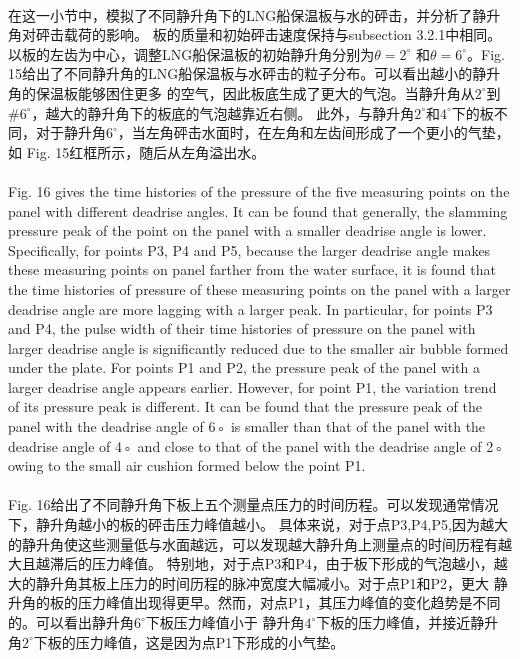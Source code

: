 \documentclass[UTF8]{ctexart}
\begin{document}
\paragraph{\quad}在这一小节中，模拟了不同静升角下的LNG船保温板与水的砰击，并分析了静升角对砰击载荷的影响。
                板的质量和初始砰击速度保持与subsection 3.2.1中相同。以板的左齿为中心，调整LNG船保温板的初始静升角分别为$\theta = 2^\circ$
                和$\theta = 6^\circ$。Fig. 15给出了不同静升角的LNG船保温板与水砰击的粒子分布。可以看出越小的静升角的保温板能够困住更多
                的空气，因此板底生成了更大的气泡。当静升角从$2^\circ$到#$6^\circ$，越大的静升角下的板底的气泡越靠近右侧。
                此外，与静升角$2^\circ$和$4^\circ$下的板不同，对于静升角$6^\circ$，当左角砰击水面时，在左角和左齿间形成了一个更小的气垫，如
                Fig. 15红框所示，随后从左角溢出水。

\paragraph{\quad}Fig. 16 gives the time histories of the pressure of the five measuring points on the panel 
                with different deadrise angles. It can be found that generally, the slamming pressure peak 
                of the point on the panel with a smaller deadrise angle is lower. Specifically, for points 
                P3, P4 and P5, because the larger deadrise angle makes these measuring points on panel farther 
                from the water surface, it is found that the time histories of pressure of these measuring 
                points on the panel with a larger deadrise angle are more lagging with a larger peak. 
                In particular, for points P3 and P4, the pulse width of their time histories of pressure on 
                the panel with larger deadrise angle is significantly reduced due to the smaller air bubble 
                formed under the plate. For points P1 and P2, the pressure peak of the panel with a larger 
                deadrise angle appears earlier. However, for point P1, the variation trend of its pressure 
                peak is different. It can be found that the pressure peak of the panel with the deadrise angle 
                of 6◦ is smaller than that of the panel with the deadrise angle of 4◦ and close to that of the 
                panel with the deadrise angle of 2◦ owing to the small air cushion formed below the point P1.
\paragraph{\quad}Fig. 16给出了不同静升角下板上五个测量点压力的时间历程。可以发现通常情况下，静升角越小的板的砰击压力峰值越小。
                具体来说，对于点P3,P4,P5,因为越大的静升角使这些测量低与水面越远，可以发现越大静升角上测量点的时间历程有越大且越滞后的压力峰值。
                特别地，对于点P3和P4，由于板下形成的气泡越小，越大的静升角其板上压力的时间历程的脉冲宽度大幅减小。对于点P1和P2，更大
                静升角的板的压力峰值出现得更早。然而，对点P1，其压力峰值的变化趋势是不同的。可以看出静升角$6^\circ$下板压力峰值小于
                静升角$4^\circ$下板的压力峰值，并接近静升角$2^\circ$下板的压力峰值，这是因为点P1下形成的小气垫。
\end{document}
